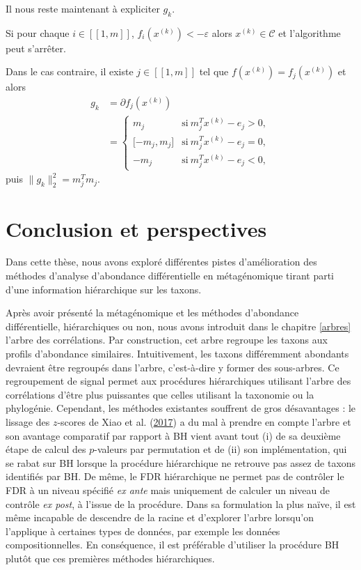 \documentclass[12pt,a4paper]{reedthesis}
\theoremstyle{definition}
\theoremstyle{definition}
\theoremstyle{definition}
\theoremstyle{remark}
\begin{document}
Il nous reste maintenant à expliciter \(g_k\).

Si pour chaque \(i \in [\![1,m]\!]\), \(f_i\left(x^{(k)}\right) < -\varepsilon\) alors \(x^{(k)} \in \mathcal{C}\) et l'algorithme peut s'arrêter.

Dans le cas contraire, il existe \(j\in [\![1,m]\!]\) tel que \(f\left(x^{(k)}\right) = f_j\left(x^{(k)}\right)\) et alors
\begin{equation*}
\begin{aligned}
g_k & = \partial f_j\left(x^{(k)}\right) \\
& = 
  \begin{cases}
  m_j & \text{si}\ m_j^Tx^{(k)} - e_j > 0,\\
  \mathopen[-m_j, m_j\mathclose] & \text{si}\ m_j^Tx^{(k)} - e_j = 0,\\
  -m_j & \text{si}\ m_j^Tx^{(k)} - e_j < 0,
  \end{cases}
\end{aligned}
\end{equation*}
puis \(\|g_k\|_2^2 = m_j^Tm_j\).

\hypertarget{conclusion-et-perspectives}{%
\chapter*{Conclusion et perspectives}\label{conclusion-et-perspectives}}

Dans cette thèse, nous avons exploré différentes pistes d'amélioration des méthodes d'analyse d'abondance différentielle en métagénomique tirant parti d'une information hiérarchique sur les taxons.

Après avoir présenté la métagénomique et les méthodes d'abondance différentielle, hiérarchiques ou non, nous avons introduit dans le chapitre \ref{arbres} l'arbre des corrélations. Par construction, cet arbre regroupe les taxons aux profils d'abondance similaires. Intuitivement, les taxons différemment abondants devraient être regroupés dans l'arbre, c'est-à-dire y former des sous-arbres. Ce regroupement de signal permet aux procédures hiérarchiques utilisant l'arbre des corrélations d'être plus puissantes que celles utilisant la taxonomie ou la phylogénie. Cependant, les méthodes existantes souffrent de gros désavantages : le lissage des \(z\)-scores de Xiao et al. (\protect\hyperlink{ref-xiao2017false}{2017}) a du mal à prendre en compte l'arbre et son avantage comparatif par rapport à BH vient avant tout (i) de sa deuxième étape de calcul des \(p\)-valeurs par permutation et de (ii) son implémentation, qui se rabat sur BH lorsque la procédure hiérarchique ne retrouve pas assez de taxons identifiés par BH. De même, le FDR hiérarchique ne permet pas de contrôler le FDR à un niveau spécifié \emph{ex ante} mais uniquement de calculer un niveau de contrôle \emph{ex post}, à l'issue de la procédure. Dans sa formulation la plus naïve, il est même incapable de descendre de la racine et d'explorer l'arbre lorsqu'on l'applique à certaines types de données, par exemple les données compositionnelles. En conséquence, il est préférable d'utiliser la procédure BH plutôt que ces premières méthodes hiérarchiques.
\end{document}
